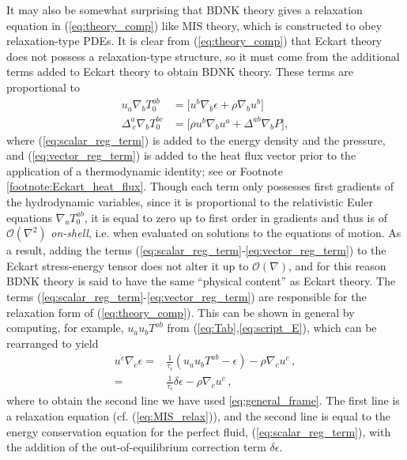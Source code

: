 \documentclass[%
notitlepage,
superscriptaddress,
nofootinbib,
amsmath,
amssymb,
aps,
twocolumn
]{revtex4-1}
\begin{document}
It may also be somewhat surprising that BDNK theory gives a relaxation
equation in (\ref{eq:theory_comp}) like MIS theory, which is constructed to
obey relaxation-type PDEs.  
It is clear from (\ref{eq:theory_comp}) that
Eckart theory does not possess a relaxation-type structure, so it must come
from the additional terms added to Eckart theory to obtain BDNK theory.
These terms are proportional to
\begin{align}
u_{a} \nabla_{b} T^{ab}_{0} &= \big[ u^b \nabla_b \epsilon + \rho \nabla_b u^b \big] \label{eq:scalar_reg_term}  \\
\Delta^{a}_{~c} \nabla_{b} T^{bc}_{0} &= \big[ \rho u^{b} \nabla_{b} u^{a} + \Delta^{a b} \nabla_{b} P \big], \label{eq:vector_reg_term}
\end{align}
where (\ref{eq:scalar_reg_term}) is added to the energy
density and the pressure, and (\ref{eq:vector_reg_term}) is
added to the heat flux vector prior to the application of a thermodynamic
identity; see \cite{Bemfica:2020zjp} or Footnote
\ref{footnote:Eckart_heat_flux}.  Though each term only possesses first
gradients of the hydrodynamic variables, since it is proportional to
the relativistic Euler equations $\nabla_{a} T^{ab}_{0}$, it is equal to
zero up to first order in gradients and thus is of
$\mathcal{O}(\nabla^{2})$ \textit{on-shell}, i.e. when evaluated on
solutions to the equations of motion.  As a result, adding the terms
(\ref{eq:scalar_reg_term}-\ref{eq:vector_reg_term}) to the Eckart
stress-energy tensor does not alter it up to $\mathcal{O}(\nabla)$, and for
this reason BDNK theory is said to have the same ``physical content'' as
Eckart theory.  The terms
(\ref{eq:scalar_reg_term}-\ref{eq:vector_reg_term}) are responsible for the
relaxation form of (\ref{eq:theory_comp}).  This can be shown in general by
computing, for example, ${u_{a} u_{b} T^{ab}}$ from
(\ref{eq:Tab},\ref{eq:script_E}), which can be rearranged to yield
\begin{equation}
\begin{aligned}
u^c \nabla_c \epsilon =& \frac{1}{\tau_{\epsilon}} (u_{a} u_{b} T^{ab} -
\epsilon) - \rho \nabla_c u^c \,, \\
=& \frac{1}{\tau_{\epsilon}} \delta \epsilon - \rho \nabla_c u^c \,,\,
\end{aligned}
\end{equation}
where to obtain the second line we have used \eqref{eq:general_frame}. 
The first line is a relaxation equation (cf. (\ref{eq:MIS_relax})),
and the second line is equal to the energy conservation
equation for the perfect fluid, (\ref{eq:scalar_reg_term}),
with the addition of the out-of-equilibrium correction term $\delta
\epsilon$.
\end{document}
